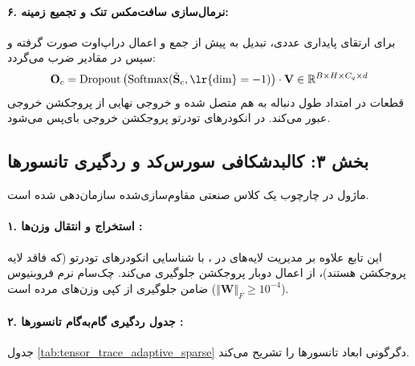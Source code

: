 \paragraph{۶. نرمال‌سازی سافت‌مکس تنک و تجمیع زمینه:}
برای ارتقای پایداری عددی، تبدیل به  پیش از جمع و اعمال دراپ‌اوت صورت گرفته و سپس در مقادیر ضرب می‌گردد:
\begin{equation}
\mathbf{O}_c = \operatorname{Dropout}\left(\operatorname{Softmax}(\tilde{\mathbf{S}}_c, \text{\lr{dim}}=-1)\right) \cdot \mathbf{V} \in \mathbb{R}^{B \times H \times C_q \times d}
\end{equation}
قطعات در امتداد طول دنباله به هم متصل شده و خروجی نهایی از پروجکشن خروجی عبور می‌کند. در انکودرهای تودرتو  پروجکشن خروجی بای‌پس می‌شود.

\subsection*{بخش ۳: کالبدشکافی سورس‌کد و ردگیری تانسورها }
ماژول  در چارچوب یک کلاس صنعتی مقاوم‌سازی‌شده  سازمان‌دهی شده است.

\paragraph{۱. استخراج و انتقال وزن‌ها :}
این تابع علاوه بر مدیریت لایه‌های  در ، با شناسایی انکودرهای تودرتو (که فاقد لایه پروجکشن هستند)، از اعمال دوبار پروجکشن جلوگیری می‌کند. چک‌سام نرم فروبنیوس ($\Vert\mathbf{W}\Vert_F \ge 10^{-4}$) ضامن جلوگیری از کپی وزن‌های مرده است.

\paragraph{۲. جدول ردگیری گام‌به‌گام تانسورها :}
جدول \ref{tab:tensor_trace_adaptive_sparse} دگرگونی ابعاد تانسورها را تشریح می‌کند.

